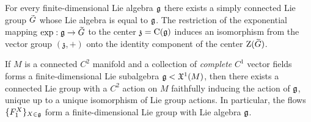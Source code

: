\begin{thm}\label{thm 1.14.3 DK global Lie's third}
    For every finite-dimensional Lie algebra $\mathfrak{g}$ there exists a simply connected Lie group $\wt{G}$ whose Lie algebra is equal to $\mathfrak{g}$. The restriction of the exponential mapping $\exp:\frakg\to\wt{G}$ to the center $\mathfrak{z}=\mathrm{C}(\mathfrak{g})$ induces an isomorphism from the vector group $(\mathfrak{z},+)$ onto the identity component of the center $\rmZ(\wt{G})$.
\end{thm}
\begin{cor}\label{thm Lie-Palais}
    If $M$ is a connected $C^2$ manifold and a collection of \emph{complete} $C^1$ vector fields forms a finite-dimensional Lie subalgebra $\mathfrak{g}<\mathfrak{X}^1(M)$, then there exists a connected Lie group with a $C^2$ action on $M$ faithfully inducing the action of $\mathfrak{g}$, unique up to a unique isomorphism of Lie group actions. In particular, the flows $\{F^X_1\}_{X\in \mathfrak{g}}$ form a finite-dimensional Lie group with Lie algebra $\mathfrak{g}$.
\end{cor}


